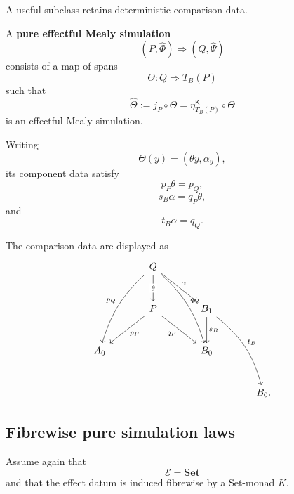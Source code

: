 A useful subclass retains deterministic comparison data.

\begin{definition}
\label{def:pure-effectful-mealy-simulation}
    A \textbf{pure effectful Mealy simulation}
    \[
        (P,\widehat\Phi)
        \Rightarrow
        (Q,\widehat\Psi)
    \]
    consists of a map of spans
    \[
        \Theta:
        Q
        \Rightarrow
        T_B(P)
    \]
    such that
    \[
        \widehat\Theta
        :=
        j_P\circ\Theta
        =
        \eta^{\mathsf K}_{T_B(P)}
        \circ
        \Theta
    \]
    is an effectful Mealy simulation.

    Writing
    \[
        \Theta(y)
        =
        (\theta y,\alpha_y),
    \]
    its component data satisfy
    \[
        p_P\theta=p_Q,
    \]
    \[
        s_B\alpha=q_P\theta,
    \]
    and
    \[
        t_B\alpha=q_Q.
    \]
\end{definition}

The comparison data are displayed as
\[
    \begin{tikzcd}[column sep=large, row sep=large]
            &
                Q
                    \arrow[d, "\theta" description]
                    \arrow[ddl, "p_Q"', bend right=15]
                    \arrow[ddr, "q_Q", bend left=15]
                    \arrow[dr, "\alpha"]
            &
        \\
            &
                P
                    \arrow[dl, "p_P"]
                    \arrow[dr, "q_P"']
            &
                B_1
                    \arrow[d, "s_B"]
                    \arrow[ddr, "t_B", bend left=18]
        \\
                A_0
            &
            &
                B_0
        \\
            &
            &
            &
                B_0.
    \end{tikzcd}
\]

\subsection{Fibrewise pure simulation laws}
\label{subsec:fibrewise-pure-effectful-simulation-laws}

Assume again that
\[
    \mathcal E=\mathbf{Set}
\]
and that the effect datum is induced fibrewise by a Set-monad \(K\).

